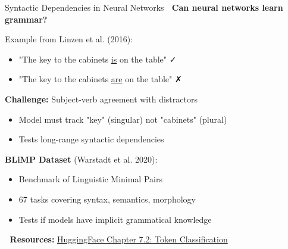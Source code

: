 \documentclass[aspectratio=169]{beamer}
\begin{document}
\begin{frame}[shrink=10]{Syntactic Dependencies in Neural Networks 🧠}
    \textbf{Can neural networks learn grammar?}

    \vspace{0.5em}
    Example from Linzen et al. (2016):
    \begin{itemize}\setlength{\itemsep}{0pt}
        \item "The key to the cabinets \underline{is} on the table" ✓
        \item "The key to the cabinets \underline{are} on the table" ✗
    \end{itemize}

    \vspace{0.5em}
    \textbf{Challenge:} Subject-verb agreement with distractors
    \begin{itemize}\setlength{\itemsep}{0pt}
        \item Model must track "key" (singular) not "cabinets" (plural)
        \item Tests long-range syntactic dependencies
    \end{itemize}

    \vspace{0.5em}
    \textbf{BLiMP Dataset} (Warstadt et al. 2020):
    \begin{itemize}\setlength{\itemsep}{0pt}
        \item Benchmark of Linguistic Minimal Pairs
        \item 67 tasks covering syntax, semantics, morphology
        \item Tests if models have implicit grammatical knowledge
    \end{itemize}

    \vspace{0.5em}
    📖 \textbf{Resources:} \href{https://huggingface.co/learn/nlp-course/chapter7/2}{HuggingFace Chapter 7.2: Token Classification}
\end{frame}
\end{document}
